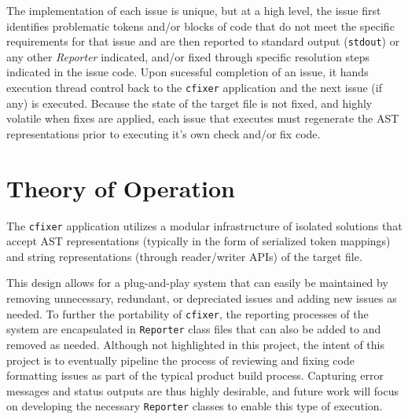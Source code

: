 \documentclass[11pt]{scrreprt}
\begin{document}
The implementation of each issue is unique, but at a high level, the issue first identifies problematic tokens and/or blocks of code that do not meet the specific requirements for that issue and are then reported to standard output (\texttt{stdout}) or any other \textit{Reporter} indicated, and/or fixed through specific resolution steps indicated in the issue code.
Upon sucessful completion of an issue, it hands execution thread control back to the \texttt{cfixer} application and the next issue (if any) is executed.
Because the state of the target file is not fixed, and highly volatile when fixes are applied, each issue that executes must regenerate the AST representations prior to executing it's own check and/or fix code.

\section{Theory of Operation}

The \texttt{cfixer} application utilizes a modular infrastructure of isolated solutions that accept AST representations (typically in the form of serialized token mappings) and string representations (through reader/writer APIs) of the target file.

This design allows for a plug-and-play system that can easily be maintained by removing unnecessary, redundant, or depreciated issues and adding new issues as needed.
To further the portability of \texttt{cfixer}, the reporting processes of the system are encapsulated in \texttt{Reporter} class files that can also be added to and removed as needed.
Although not highlighted in this project, the intent of this project is to eventually pipeline the process of reviewing and fixing code formatting issues as part of the typical product build process.
Capturing error messages and status outputs are thus highly desirable, and future work will focus on developing the necessary \texttt{Reporter} classes to enable this type of execution.
\end{document}
